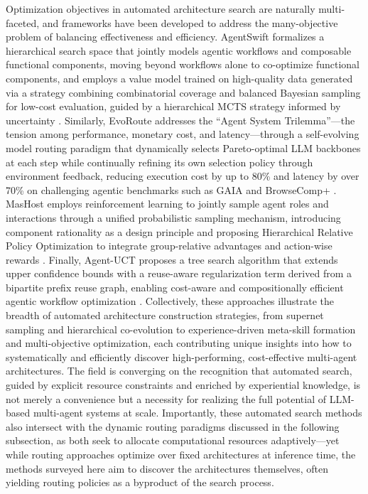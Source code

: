 \documentclass[11pt]{article}
\begin{document}
Optimization objectives in automated architecture search are naturally multi-faceted, and frameworks have been developed to address the many-objective problem of balancing effectiveness and efficiency. AgentSwift formalizes a hierarchical search space that jointly models agentic workflows and composable functional components, moving beyond workflows alone to co-optimize functional components, and employs a value model trained on high-quality data generated via a strategy combining combinatorial coverage and balanced Bayesian sampling for low-cost evaluation, guided by a hierarchical MCTS strategy informed by uncertainty \cite{ref275}. Similarly, EvoRoute addresses the ``Agent System Trilemma''---the tension among performance, monetary cost, and latency---through a self-evolving model routing paradigm that dynamically selects Pareto-optimal LLM backbones at each step while continually refining its own selection policy through environment feedback, reducing execution cost by up to 80\% and latency by over 70\% on challenging agentic benchmarks such as GAIA and BrowseComp+ \cite{ref276}. MasHost employs reinforcement learning to jointly sample agent roles and interactions through a unified probabilistic sampling mechanism, introducing component rationality as a design principle and proposing Hierarchical Relative Policy Optimization to integrate group-relative advantages and action-wise rewards \cite{ref277}. Finally, Agent-UCT proposes a tree search algorithm that extends upper confidence bounds with a reuse-aware regularization term derived from a bipartite prefix reuse graph, enabling cost-aware and compositionally efficient agentic workflow optimization \cite{ref278}. Collectively, these approaches illustrate the breadth of automated architecture construction strategies, from supernet sampling and hierarchical co-evolution to experience-driven meta-skill formation and multi-objective optimization, each contributing unique insights into how to systematically and efficiently discover high-performing, cost-effective multi-agent architectures. The field is converging on the recognition that automated search, guided by explicit resource constraints and enriched by experiential knowledge, is not merely a convenience but a necessity for realizing the full potential of LLM-based multi-agent systems at scale. Importantly, these automated search methods also intersect with the dynamic routing paradigms discussed in the following subsection, as both seek to allocate computational resources adaptively---yet while routing approaches optimize over fixed architectures at inference time, the methods surveyed here aim to discover the architectures themselves, often yielding routing policies as a byproduct of the search process.
\end{document}
